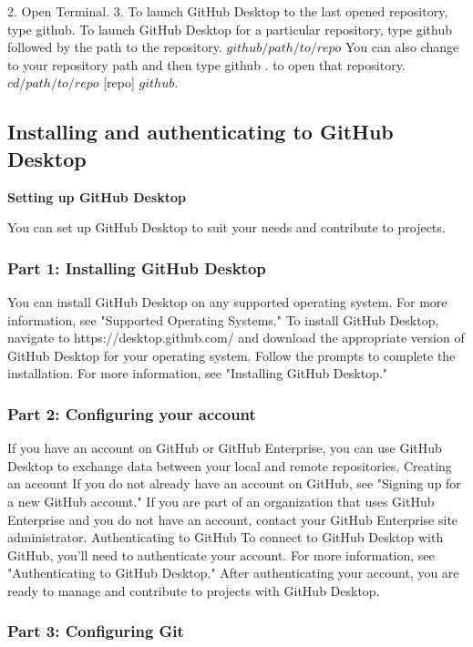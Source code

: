 2.	Open Terminal.
3.	To launch GitHub Desktop to the last opened repository, type github. To launch GitHub Desktop for a particular repository, type github followed by the path to the repository.
$ github / path / to/ repo $
You can also change to your repository path and then type github .
to open that repository.
$ cd /path/to/repo $
[repo] $  github .$



 \subsection{Installing and authenticating to GitHub Desktop }
 
\textbf{Setting up GitHub Desktop }

You can set up GitHub Desktop to suit your needs and contribute to projects.

\subsubsection{Part 1: Installing GitHub Desktop}
You can install GitHub Desktop on any supported operating system. For more information, see "Supported Operating Systems."
To install GitHub Desktop, navigate to https://desktop.github.com/ and download the appropriate version of GitHub Desktop for your operating system. Follow the prompts to complete the installation. For more information, see "Installing GitHub Desktop."

\subsubsection{Part 2: Configuring your account}

If you have an account on GitHub or GitHub Enterprise, you can use GitHub Desktop to exchange data between your local and remote repositories.
Creating an account
If you do not already have an account on GitHub, see "Signing up for a new GitHub account."
If you are part of an organization that uses GitHub Enterprise and you do not have an account, contact your GitHub Enterprise site administrator.
Authenticating to GitHub
To connect to GitHub Desktop with GitHub, you'll need to authenticate your account. For more information, see "Authenticating to GitHub Desktop."
After authenticating your account, you are ready to manage and contribute to projects with GitHub Desktop.

\subsubsection{Part 3: Configuring Git }

